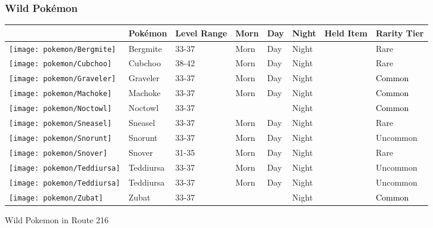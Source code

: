 \subsubsection{Wild Pokémon}%
\label{ssubsec:WildPokmon}%
\begin{longtable}{||l l l l l l l l||}%
\hline%
\rowcolor{GroundColor}%
&Pokémon&Level Range&Morn&Day&Night&Held Item&Rarity Tier\\%
\hline%
\endhead%
\hline%
\rowcolor{GroundColor}%
\texttt{[image: pokemon/Bergmite]}&Bergmite&33{-}37&Morn&Day&Night&&\textcolor{RedOrange}{%
Rare%
}\\%
\hline%
\rowcolor{GroundColor}%
\texttt{[image: pokemon/Cubchoo]}&Cubchoo&38{-}42&Morn&Day&Night&&\textcolor{RedOrange}{%
Rare%
}\\%
\hline%
\rowcolor{GroundColor}%
\texttt{[image: pokemon/Graveler]}&Graveler&33{-}37&Morn&Day&Night&&\textcolor{black}{%
Common%
}\\%
\hline%
\rowcolor{GroundColor}%
\texttt{[image: pokemon/Machoke]}&Machoke&33{-}37&Morn&Day&Night&&\textcolor{black}{%
Common%
}\\%
\hline%
\rowcolor{GroundColor}%
\texttt{[image: pokemon/Noctowl]}&Noctowl&33{-}37&&&Night&&\textcolor{black}{%
Common%
}\\%
\hline%
\rowcolor{GroundColor}%
\texttt{[image: pokemon/Sneasel]}&Sneasel&33{-}37&Morn&Day&Night&&\textcolor{RedOrange}{%
Rare%
}\\%
\hline%
\rowcolor{GroundColor}%
\texttt{[image: pokemon/Snorunt]}&Snorunt&33{-}37&Morn&Day&Night&&\textcolor{OliveGreen}{%
Uncommon%
}\\%
\hline%
\rowcolor{GroundColor}%
\texttt{[image: pokemon/Snover]}&Snover&31{-}35&Morn&Day&Night&&\textcolor{RedOrange}{%
Rare%
}\\%
\hline%
\rowcolor{GroundColor}%
\texttt{[image: pokemon/Teddiursa]}&Teddiursa&33{-}37&Morn&Day&Night&&\textcolor{OliveGreen}{%
Uncommon%
}\\%
\hline%
\rowcolor{GroundColor}%
\texttt{[image: pokemon/Teddiursa]}&Teddiursa&33{-}37&Morn&Day&Night&&\textcolor{OliveGreen}{%
Uncommon%
}\\%
\hline%
\rowcolor{GroundColor}%
\texttt{[image: pokemon/Zubat]}&Zubat&33{-}37&&&Night&&\textcolor{black}{%
Common%
}\\%
\hline%
\end{longtable}%
\caption{Wild Pokemon in Route 216}